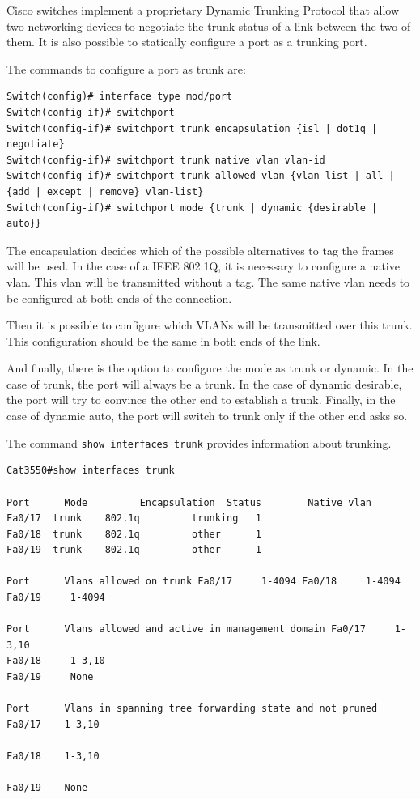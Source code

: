 Cisco switches implement a proprietary Dynamic Trunking Protocol that allow two networking devices to negotiate the trunk status of a link between the two of them.
It is also possible to statically configure a port as a trunking port.

The commands to configure a port as trunk are:

\begin{lstlisting}
Switch(config)# interface type mod/port
Switch(config-if)# switchport
Switch(config-if)# switchport trunk encapsulation {isl | dot1q | negotiate}
Switch(config-if)# switchport trunk native vlan vlan-id
Switch(config-if)# switchport trunk allowed vlan {vlan-list | all |
{add | except | remove} vlan-list}
Switch(config-if)# switchport mode {trunk | dynamic {desirable | auto}}
\end{lstlisting}

The encapsulation decides which of the possible alternatives to tag the frames will be used.
In the case of a IEEE 802.1Q, it is necessary to configure a native vlan.
This vlan will be transmitted without a tag.
The same native vlan needs to be configured at both ends of the connection.

Then it is possible to configure which VLANs will be transmitted over this trunk.
This configuration should be the same in both ends of the link.

And finally, there is the option to configure the mode as trunk or dynamic.
In the case of trunk, the port will always be a trunk.
In the case of dynamic desirable, the port will try to convince the other end to establish a trunk.
Finally, in the case of dynamic auto, the port will switch to trunk only if the other end asks so.

The command \texttt{show interfaces trunk} provides information about trunking.
\begin{lstlisting}
Cat3550#show interfaces trunk 

Port      Mode         Encapsulation  Status        Native vlan
Fa0/17  trunk    802.1q         trunking   1
Fa0/18  trunk    802.1q         other      1
Fa0/19  trunk    802.1q         other      1

Port      Vlans allowed on trunk Fa0/17     1-4094 Fa0/18     1-4094
Fa0/19     1-4094

Port      Vlans allowed and active in management domain Fa0/17     1-3,10 
Fa0/18     1-3,10
Fa0/19     None

Port      Vlans in spanning tree forwarding state and not pruned  
Fa0/17    1-3,10

Fa0/18    1-3,10

Fa0/19    None
\end{lstlisting}

